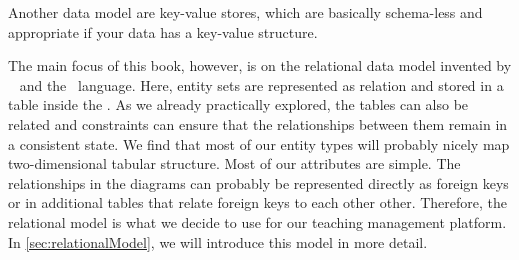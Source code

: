 Another data model are key-value stores, which are basically schema-less and appropriate if your data has a key-value structure.

The main focus of this book, however, is on the relational data model invented by \citeauthor{C1970ARMODFLSDB}~\cite{C1970ARMODFLSDB} and the \sql\ language.
Here, entity sets are represented as relation and stored in a table inside the \db.
As we already practically explored, the tables can also be related and constraints can ensure that the relationships between them remain in a consistent state.
We find that most of our entity types will probably nicely map two-dimensional tabular structure.
Most of our attributes are simple.
The relationships in the diagrams can probably be represented directly as foreign keys or in additional tables that relate foreign keys to each other other.
Therefore, the relational model is what we decide to use for our teaching management platform.
In \cref{sec:relationalModel}, we will introduce this model in more detail.%
%
\endhsection%
%
